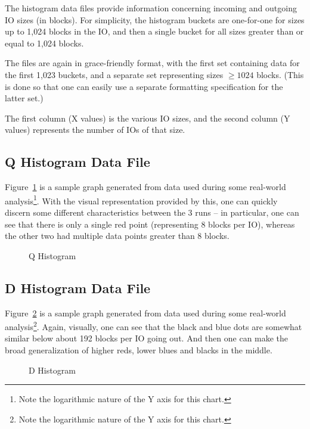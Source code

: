 \documentclass{article}
\begin{document}
  The histogram data files provide information concerning incoming and
  outgoing IO sizes (in blocks). For simplicity, the histogram buckets
  are one-for-one for sizes up to 1,024 blocks in the IO, and then a
  single bucket for all sizes greater than or equal to 1,024 blocks.

  The files are again in grace-friendly format, with the first set
  containing data for the first 1,023 buckets, and a separate set
  representing sizes $\ge 1024$ blocks. (This is done so that one can
  easily use a separate formatting specification for the latter set.)

  The first column (X values) is the various IO sizes, and the second
  column (Y values) represents the number of IOs of that size.

\subsection{\label{sec:qhist}Q Histogram Data File}

  Figure~\ref{fig:qhist} is a sample graph generated from data used during
  some real-world analysis\footnote{Note the logarithmic nature of the
  Y axis for this chart.}. With the visual representation provided by
  this, one can quickly discern some different characteristics between
  the 3 runs -- in particular, one can see that there is only a single
  red point (representing 8 blocks per IO), whereas the other two had
  multiple data points greater than 8 blocks.

  \begin{figure}[hb]
  \leavevmode\centering
  \caption{\label{fig:qhist}Q Histogram}
  \end{figure}

\subsection{\label{sec:dhist}D Histogram Data File}

  Figure~\ref{fig:dhist} is a sample graph generated from data used during
  some real-world analysis\footnote{Note the logarithmic nature of the
  Y axis for this chart.}. Again, visually, one can see that the black
  and blue dots are somewhat similar below about 192 blocks per IO going
  out. And then one can make the broad generalization of higher reds,
  lower blues and blacks in the middle.

  \begin{figure}[hb]
  \leavevmode\centering
  \caption{\label{fig:dhist}D Histogram}
  \end{figure}
\end{document}
